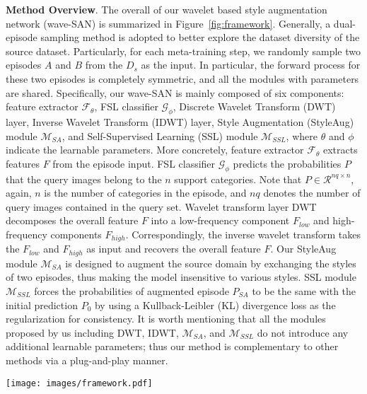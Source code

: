 \documentclass{article}
\begin{document}
\noindent\textbf{Method Overview}. The overall of our wavelet based style augmentation network (wave-SAN) is summarized in Figure~\ref{fig:framework}. Generally, a dual-episode sampling method is adopted to better explore the dataset diversity of the source dataset. Particularly, for each meta-training step, we randomly sample two episodes $A$ and $B$ from the $D_s$ as the input. In particular, the forward process for these two episodes is completely symmetric, and all the modules with parameters are shared. Specifically,
our wave-SAN is mainly composed of six components: feature extractor $\mathcal{F}_\theta$, FSL classifier $\mathcal{G}_\phi$, Discrete Wavelet Transform (DWT) layer, Inverse Wavelet Transform (IDWT) layer, Style Augmentation (StyleAug) module $\mathcal{M}_{SA}$, and Self-Supervised Learning (SSL) module $\mathcal{M}_{SSL}$, where $\theta$ and $\phi$ indicate the learnable parameters.  More concretely, feature extractor $\mathcal{F}_\theta$  extracts features $F$ from the episode input. FSL classifier $\mathcal{G}_\phi$ predicts the probabilities $P$ that the query images belong to the $n$ support categories. Note that $P \in \mathcal{R}^{nq\times n}$, again, $n$ is the number of categories in the episode, and $nq$ denotes the number of query images contained in the query set. Wavelet transform layer DWT decomposes the overall feature $F$ into a low-frequency component $F_{low}$ and high-frequency components $F_{high}$. Correspondingly, the inverse wavelet transform takes the $F_{low}$ and $F_{high}$ as input and recovers the overall feature $F$. 
	Our StyleAug module $\mathcal{M}_{SA}$ is designed to augment the source domain by exchanging the styles of two episodes, thus making the model insensitive to various styles. SSL module $\mathcal{M}_{SSL}$ forces the probabilities of augmented episode $P_{SA}$ to be the same with the initial prediction $P_{0}$ by using a Kullback-Leibler (KL) divergence loss as the regularization for consistency. It is worth mentioning that all the modules proposed by us including DWT, IDWT, $\mathcal{M}_{SA}$, and $\mathcal{M}_{SSL}$ do not introduce any additional learnable parameters; thus our method is complementary to other methods via a plug-and-play manner.
	
	\begin{figure*}[t!]
		\centering
{\texttt{[image: images/framework.pdf]}}
		\vspace{-0.1in}
		\caption{\textbf{Overview of our wave-SAN network.} In the network, a dual-episode sampling mechanism is adopted. For each episode, two predictions are generated. One is obtained by directly feeding the episode into the feature extractor and FSL classifier (black arrows), while the other one is obtained by taking the style-augmented features as input (green or orange arrows). The style augmentation is implemented by the proposed StyleAug module which exchanges the styles of two low-frequency components decomposed by wavelet transform. Then an SSL module is introduced for keeping these two predictions similar.}
		\label{fig:framework} \vspace{-0.15in}
	\end{figure*}	
\end{document}
